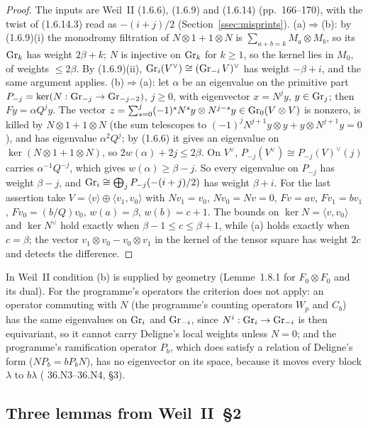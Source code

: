 \begin{proof}
The inputs are Weil~II (1.6.6), (1.6.9) and (1.6.14) (pp.~166--170), with the twist of (1.6.14.3) read as $-(i+j)/2$ (Section~\ref{ssec:misprints}).
(a)$\Rightarrow$(b): by (1.6.9)(i) the monodromy filtration of $N\otimes1+1\otimes N$ is $\sum_{a+b=k}M_a\otimes M_b$, so its $\operatorname{Gr}_k$ has weight $2\beta+k$; $N$ is injective on $\operatorname{Gr}_k$ for $k\ge1$, so the kernel lies in $M_0$, of weights $\le2\beta$. By (1.6.9)(ii), $\operatorname{Gr}_i(V^\vee)\cong(\operatorname{Gr}_{-i}V)^\vee$ has weight $-\beta+i$, and the same argument applies.
(b)$\Rightarrow$(a): let $\alpha$ be an eigenvalue on the primitive part $P_{-j}=\ker(N:\operatorname{Gr}_{-j}\to\operatorname{Gr}_{-j-2})$, $j\ge0$, with eigenvector $x=N^jy$, $y\in\operatorname{Gr}_j$; then $Fy=\alpha Q^jy$. The vector $z=\sum_{s=0}^j(-1)^sN^sy\otimes N^{j-s}y\in\operatorname{Gr}_0(V\otimes V)$ is nonzero, is killed by $N\otimes1+1\otimes N$ (the sum telescopes to $(-1)^jN^{j+1}y\otimes y+y\otimes N^{j+1}y=0$), and has eigenvalue $\alpha^2Q^j$; by (1.6.6) it gives an eigenvalue on $\ker(N\otimes1+1\otimes N)$, so $2w(\alpha)+2j\le2\beta$. On $V^\vee$, $P_{-j}(V^\vee)\cong P_{-j}(V)^\vee(j)$ carries $\alpha^{-1}Q^{-j}$, which gives $w(\alpha)\ge\beta-j$. So every eigenvalue on $P_{-j}$ has weight $\beta-j$, and $\operatorname{Gr}_i\cong\bigoplus_jP_{-j}(-(i+j)/2)$ has weight $\beta+i$.
For the last assertion take $V=\langle v\rangle\oplus\langle v_1,v_0\rangle$ with $Nv_1=v_0$, $Nv_0=Nv=0$, $Fv=av$, $Fv_1=bv_1$, $Fv_0=(b/Q)v_0$, $w(a)=\beta$, $w(b)=c+1$. The bounds on $\ker N=\langle v,v_0\rangle$ and $\ker N^\vee$ hold exactly when $\beta-1\le c\le\beta+1$, while (a) holds exactly when $c=\beta$; the vector $v_1\otimes v_0-v_0\otimes v_1$ in the kernel of the tensor square has weight $2c$ and detects the difference.
\end{proof}

In Weil~II condition (b) is supplied by geometry (Lemme~1.8.1 for $F_0\otimes F_0$ and its dual). For the programme's operators the criterion does not apply: an operator commuting with $N$ (the programme's counting operators $W_p$ and $C_b$) has the same eigenvalues on $\operatorname{Gr}_i$ and $\operatorname{Gr}_{-i}$, since $N^i:\operatorname{Gr}_i\to\operatorname{Gr}_{-i}$ is then equivariant, so it cannot carry Deligne's local weights unless $N=0$; and the programme's ramification operator $P_b$, which does satisfy a relation of Deligne's form ($NP_b=bP_bN$), has no eigenvector on its space, because it moves every block $\lambda$ to $b\lambda$ ( 36.N3--36.N4,  §3).

\subsection{Three lemmas from Weil~II~§2}

